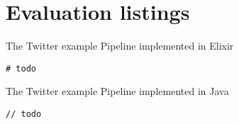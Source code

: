 \chapter{Evaluation listings}\label{apx:twitter-code}

\begin{codelisting}
\caption{The Twitter example Pipeline implemented in Elixir}
\label{lst:apxb:twitter-elixir}
\begin{verbatim}
# todo
\end{verbatim}
\end{codelisting}

\begin{codelisting}
\caption{The Twitter example Pipeline implemented in Java}
\label{lst:apxb:twitter-java}
\begin{verbatim}
// todo
\end{verbatim}
\end{codelisting}
